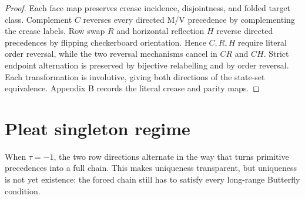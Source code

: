 \documentclass[11pt]{article}
\theoremstyle{definition}
\theoremstyle{remark}
\begin{document}
\begin{proof}
 Each face map preserves crease incidence, disjointness,
and folded target class. Complement \(C\) reverses every directed M/V
precedence by complementing the crease labels. Row swap \(R\) and
horizontal reflection \(H\) reverse directed precedences by flipping
checkerboard orientation. Hence \(C,R,H\) require literal order
reversal, while the two reversal mechanisms cancel in \(CR\) and \(CH\).
Strict endpoint alternation is preserved by bijective relabelling and by
order reversal. Each transformation is involutive, giving both
directions of the state-set equivalence. Appendix B records the literal
crease and parity maps.
\end{proof}


\section{Pleat singleton regime}\label{pleat-singleton-regime}

When \(\tau=-1\), the two row directions alternate in the way that turns
primitive precedences into a full chain. This makes uniqueness
transparent, but uniqueness is not yet existence: the forced chain still
has to satisfy every long-range Butterfly condition.
\end{document}
